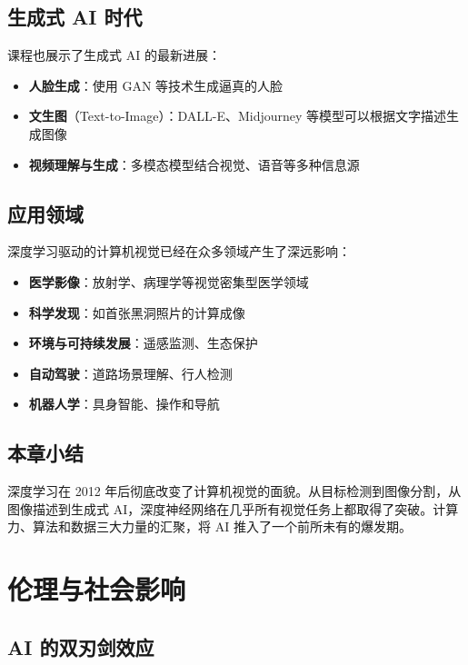 \documentclass[a4paper]{article}
\begin{document}
\subsection{生成式 AI 时代}

课程也展示了生成式 AI 的最新进展：

\begin{itemize}
    \item \textbf{人脸生成}：使用 GAN 等技术生成逼真的人脸
    \item \textbf{文生图}（Text-to-Image）：DALL-E、Midjourney 等模型可以根据文字描述生成图像
    \item \textbf{视频理解与生成}：多模态模型结合视觉、语音等多种信息源
\end{itemize}

\subsection{应用领域}

深度学习驱动的计算机视觉已经在众多领域产生了深远影响：

\begin{itemize}
    \item \textbf{医学影像}：放射学、病理学等视觉密集型医学领域
    \item \textbf{科学发现}：如首张黑洞照片的计算成像
    \item \textbf{环境与可持续发展}：遥感监测、生态保护
    \item \textbf{自动驾驶}：道路场景理解、行人检测
    \item \textbf{机器人学}：具身智能、操作和导航
\end{itemize}

\subsection{本章小结}

深度学习在 2012 年后彻底改变了计算机视觉的面貌。从目标检测到图像分割，从图像描述到生成式 AI，深度神经网络在几乎所有视觉任务上都取得了突破。计算力、算法和数据三大力量的汇聚，将 AI 推入了一个前所未有的爆发期。


\section{伦理与社会影响}

\subsection{AI 的双刃剑效应}
\end{document}
